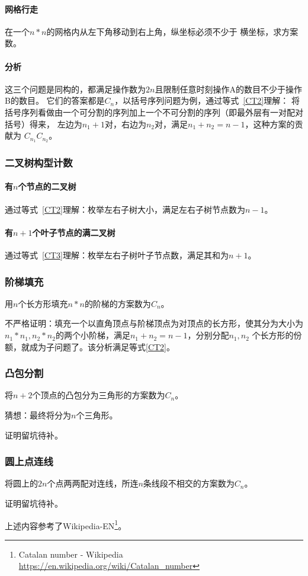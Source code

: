 \paragraph{网格行走} 在一个$n*n$的网格内从左下角移动到右上角，纵坐标必须不少于
横坐标，求方案数。
\paragraph{分析}
这三个问题是同构的，都满足操作数为$2n$且限制任意时刻操作A的数目不少于操作B的数目。
它们的答案都是$C_n$，以括号序列问题为例，通过等式~\ref{CT2}理解：
将括号序列看做由一个可分割的序列加上一个不可分割的序列（即最外层有一对配对括号）得来，
左边为$n_1+1$对，右边为$n_2$对，满足$n_1+n_2=n-1$，这种方案的贡献为
$C_{n_1}C_{n_2}$。
\subsubsection{二叉树构型计数}
\paragraph{有$n$个节点的二叉树}
通过等式~\ref{CT2}理解：枚举左右子树大小，满足左右子树节点数为$n-1$。
\paragraph{有$n+1$个叶子节点的满二叉树}
通过等式~\ref{CT3}理解：枚举左右子树叶子节点数，满足其和为$n+1$。
\subsubsection{阶梯填充}
用$n$个长方形填充$n*n$的阶梯的方案数为$C_n$。

不严格证明：填充一个以直角顶点与阶梯顶点为对顶点的长方形，使其分为大小为
$n_1*n_1,n_2*n_2$的两个小阶梯，满足$n_1+n_2=n-1$，分别分配$n_1,n_2$
个长方形的份额，就成为子问题了。该分析满足等式\ref{CT2}。
\subsubsection{凸包分割}
将$n+2$个顶点的凸包分为三角形的方案数为$C_n$。

猜想：最终将分为$n$个三角形。

证明留坑待补。
\subsubsection{圆上点连线}
将圆上的$2n$个点两两配对连线，所连$n$条线段不相交的方案数为$C_n$。

证明留坑待补。

上述内容参考了Wikipedia-EN\footnote{Catalan number - Wikipedia
	\url{https://en.wikipedia.org/wiki/Catalan\_number}}。
